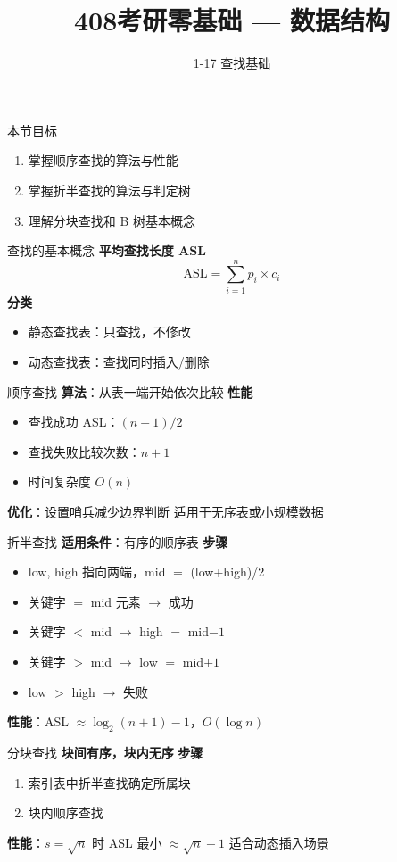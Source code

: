 \documentclass[10pt, aspectratio=169]{beamer}
\title{408考研零基础 --- 数据结构}
\subtitle{1-17 查找基础}
\author{}
\date{}
\begin{document}
\begin{frame}{本节目标}
\begin{enumerate}
\item 掌握顺序查找的算法与性能
\item 掌握折半查找的算法与判定树
\item 理解分块查找和 B 树基本概念
\end{enumerate}
\end{frame}
\begin{frame}{查找的基本概念}
\textbf{平均查找长度 ASL}
\[
\text{ASL} = \sum_{i=1}^{n} p_i \times c_i
\]
\vspace{0.3em}
\textbf{分类}
\begin{itemize}
\item 静态查找表：只查找，不修改
\item 动态查找表：查找同时插入/删除
\end{itemize}
\end{frame}
\begin{frame}{顺序查找}
\textbf{算法}：从表一端开始依次比较
\vspace{0.3em}
\textbf{性能}
\begin{itemize}
\item 查找成功 ASL：$(n+1)/2$
\item 查找失败比较次数：$n+1$
\item 时间复杂度 $O(n)$
\end{itemize}
\vspace{0.3em}
\textbf{优化}：设置哨兵减少边界判断
\vspace{0.3em}
适用于无序表或小规模数据
\end{frame}
\begin{frame}{折半查找}
\textbf{适用条件}：有序的顺序表
\vspace{0.3em}
\textbf{步骤}
\begin{itemize}
\item low, high 指向两端，mid $=$ (low+high)/2
\item 关键字 $=$ mid 元素 $\to$ 成功
\item 关键字 $<$ mid $\to$ high $=$ mid$-1$
\item 关键字 $>$ mid $\to$ low $=$ mid$+1$
\item low $>$ high $\to$ 失败
\end{itemize}
\vspace{0.3em}
\textbf{性能}：ASL $\approx \log_2(n+1)-1$，$O(\log n)$
\end{frame}
\begin{frame}{分块查找}
\textbf{块间有序，块内无序}
\vspace{0.3em}
\textbf{步骤}
\begin{enumerate}
\item 索引表中折半查找确定所属块
\item 块内顺序查找
\end{enumerate}
\vspace{0.3em}
\textbf{性能}：$s=\sqrt{n}$ 时 ASL 最小 $\approx \sqrt{n}+1$
\vspace{0.3em}
适合动态插入场景
\end{frame}
\end{document}

